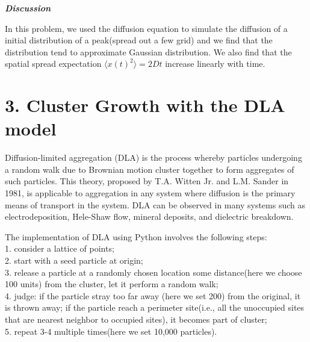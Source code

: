 \documentclass[aps,prl,preprint,superscriptaddress]{revtex4}
\begin{document}
\begin{enumerate}
\textbf{\textit{Discussion}}

In this problem, we used the diffusion equation to simulate the diffusion of a initial distribution of a peak(spread out a few grid) and we find that the distribution tend to approximate Gaussian distribution. We also find that the spatial spread expectation $\langle x(t)^2\rangle=2Dt$ increase linearly with time.
\end{enumerate}

	\section{3. Cluster Growth with the DLA model}

Diffusion-limited aggregation (DLA) is the process whereby particles undergoing a random walk due to Brownian motion cluster together to form aggregates of such particles. This theory, proposed by T.A. Witten Jr. and L.M. Sander in 1981, is applicable to aggregation in any system where diffusion is the primary means of transport in the system. DLA can be observed in many systems such as electrodeposition, Hele-Shaw flow, mineral deposits, and dielectric breakdown.

The implementation of DLA using Python involves the following steps:\\
1. consider a lattice of points;\\
2. start with a seed particle at origin;\\
3. release a particle at a randomly chosen location some distance(here we choose 100 units) from the cluster, let it perform a random walk;\\
4. judge: if the particle stray too far away (here we set 200) from the original, it is thrown away; if the particle reach a perimeter site(i.e., all the unoccupied sites that are nearest neighbor to occupied sites), it becomes part of cluster;\\
5. repeat 3-4 multiple times(here we set 10,000 particles).\\
\end{document}
